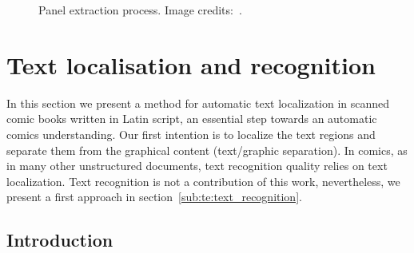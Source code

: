 \begin{figure}
	  \hspace{1em}
	  \caption[Independent panel extraction process]{Panel extraction process. Image credits:~\cite{Lubbin12}.}
	  \label{fig:in:panel_detection_process}
\end{figure}


\section{Text localisation and recognition} %
\label{sec:in:text_localisation_and_recognition}

In this section we present a method for automatic text localization in scanned comic books written in Latin script, an essential step towards an automatic comics understanding.
Our first intention is to localize the text regions and separate them from the graphical content (text/graphic separation).
In comics, as in many other unstructured documents, text recognition quality relies on text localization.
Text recognition is not a contribution of this work, nevertheless, we present a first approach in section~\ref{sub:te:text_recognition}.

\subsection{Introduction} %
\label{sub:introduction}

